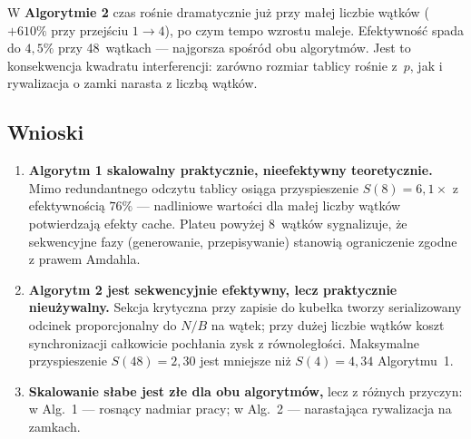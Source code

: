 \documentclass[12pt, a4paper]{article}
\begin{document}
W \textbf{Algorytmie 2} czas rośnie dramatycznie już przy małej liczbie wątków
($+610\%$ przy przejściu $1\to 4$), po czym tempo wzrostu maleje.
Efektywność spada do $4{,}5\%$ przy 48~wątkach — najgorsza spośród obu
algorytmów.
Jest to konsekwencja kwadratu interferencji: zarówno rozmiar tablicy rośnie
z~$p$, jak i rywalizacja o zamki narasta z liczbą wątków.

\subsection{Wnioski}

\begin{enumerate}
  \item \textbf{Algorytm 1 skalowalny praktycznie, nieefektywny teoretycznie.}
        Mimo redundantnego odczytu tablicy osiąga przyspieszenie
        $S(8)=6{,}1\times$ z efektywnością $76\%$ — nadliniowe wartości dla
        małej liczby wątków potwierdzają efekty cache.
        Plateu powyżej 8~wątków sygnalizuje, że sekwencyjne fazy (generowanie,
        przepisywanie) stanowią ograniczenie zgodne z prawem Amdahla.

  \item \textbf{Algorytm 2 jest sekwencyjnie efektywny, lecz praktycznie
        nieużywalny.}
        Sekcja krytyczna przy zapisie do kubełka tworzy serializowany odcinek
        proporcjonalny do $N/B$ na wątek; przy dużej liczbie wątków koszt
        synchronizacji całkowicie pochłania zysk z równoległości.
        Maksymalne przyspieszenie $S(48)=2{,}30$ jest mniejsze niż
        $S(4)=4{,}34$ Algorytmu~1.

  \item \textbf{Skalowanie słabe jest złe dla obu algorytmów,}
        lecz z różnych przyczyn: w Alg.~1 — rosnący nadmiar pracy;
        w Alg.~2 — narastająca rywalizacja na zamkach.
\end{enumerate}
\end{document}
